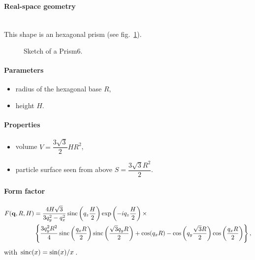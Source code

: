 \paragraph{Real-space geometry}\strut\\
This shape is an hexagonal prism (see fig.~\ref{fig:prism6}).

\begin{figure}[ht]
\hfill
{}
\hfill
{}
\hfill
\caption{Sketch of a Prism6.}
\label{fig:prism6}
\end{figure}

\FloatBarrier

\paragraph{Parameters}
\begin{itemize}
\item radius of the hexagonal base $R$,
\item height $H$.
\end{itemize}

\paragraph{Properties}
\begin{itemize}
\item volume $V = \dfrac{3\sqrt{3}}{2}H R^2$,
\item particle surface seen from above $S =\dfrac{3\sqrt{3}R^2}{2}$.
\end{itemize}

\paragraph{Form factor}
\begin{align*}
F(\mathbf{q}, R, H) &= \frac{4H\sqrt{3}}{3q_y^2 - q_x^2}
\operatorname{sinc}\left(q_z\frac{H}{2}\right) \exp\left(-i q_z\frac{ H}{2}\right)\times\\
&\left\{\frac{3q_y^2R^2}{4} \operatorname{sinc}\left(\frac{q_x
  R}{2}\right)\operatorname{sinc}\left(\frac{\sqrt{3}q_yR }{2}\right)+ \cos(q_x R)-\cos\left(q_y
\frac{\sqrt{3}R}{2}\right) \cos\left(\frac{q_x R}{2}\right)\right\},
\end{align*}
with $\operatorname{sinc}(x)=\sin(x)/x$.


